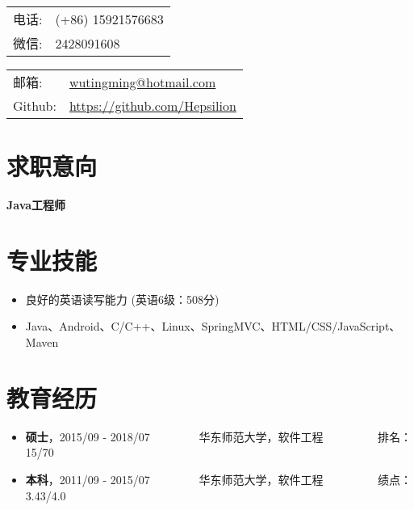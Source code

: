 \documentclass[letterpaper, UTF8, 11pt]{article}
\def\name{\textbf{\textcolor[rgb]{0.00, 0.00, 0.00}{\fontsize{30pt}{30pt}吴庭明}} ~~~~~~~~~ \fontsize{15pt}{15pt}}
\begin{document}
	
	\noindent{\bf \name} 
	\vspace{0.1in}

	\begin{minipage}{0.45\linewidth}
		\begin{tabular}{ll}
			电话:   & (+86) 15921576683 \\
			微信:   & 2428091608 \\
		\end{tabular}
	\end{minipage}
	\begin{minipage}{0.45\linewidth}
		\begin{tabular}{ll}
			邮箱:   & \href{mailto:wutingming@hotmail.com}{ wutingming@hotmail.com} \\
			Github: & \href{https://github.com/Hepsilion}{https://github.com/Hepsilion}\\
		\end{tabular}
	\end{minipage}
	\vspace{-0.1in}
	
	\section*{\textbf{求职意向}}\vspace{-0.15in}
		\textbf{Java工程师}
	\vspace{-0.25in}
	
	\section*{\textbf{专业技能}}\vspace{-0.15in}
	\begin{itemize}
		\item 良好的英语读写能力 (英语6级：508分)
		\item Java、Android、C/C++、Linux、SpringMVC、HTML/CSS/JavaScript、Maven
	\end{itemize}
	\vspace{-0.3in}
	
	\section*{\textbf{教育经历}}\vspace{-0.15in}
	\begin{itemize}
		\item \textbf{硕士}，2015/09 - 2018/07 ~~~~~~~~华东师范大学，软件工程  ~~~~~~~~~排名：15/70
		\item \textbf{本科}，2011/09 - 2015/07 ~~~~~~~~华东师范大学，软件工程  ~~~~~~~~~绩点：3.43/4.0
	\end{itemize}
	\vspace{-0.3in}
	
\end{document}
